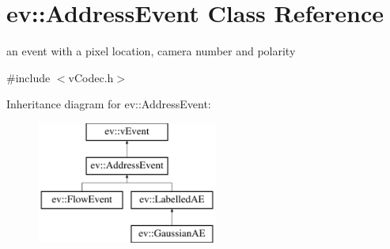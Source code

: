 \hypertarget{classev_1_1AddressEvent}{}\section{ev\+:\+:Address\+Event Class Reference}
\label{classev_1_1AddressEvent}


an event with a pixel location, camera number and polarity  




{\ttfamily \#include $<$v\+Codec.\+h$>$}

Inheritance diagram for ev\+:\+:Address\+Event\+:\begin{figure}[H]
\begin{center}
\leavevmode
\includegraphics[height=4.000000cm]{classev_1_1AddressEvent}
\end{center}
\end{figure}
